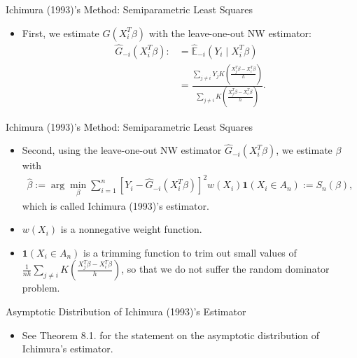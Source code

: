 \documentclass[xcolor=svgnames,dvipdfmx,cjk]{beamer}
\theoremstyle{example}
\begin{document}
\begin{frame}{Ichimura (1993)'s Method: Semiparametric Least Squares}
  \begin{itemize}
  \item First, we estimate $G(X_i^{T}\beta)$  
        with the leave-one-out NW estimator:
        \begin{align*}
          \hat{G}_{-i}(X_i^{T}\beta) 
              :&= \hat{\mathbb{E}}_{-i}(Y_i \mid X_i^{T} \beta) \\
               &= \frac
                  {\sum_{j \neq i} Y_j 
                   K \left( \frac
                            {X_j^{T}\beta - X_i^{T}\beta}
                            {h} 
                     \right) 
                  }
                  {\sum_{j \neq i} 
                   K \left( \frac
                           {X_j^{T}\beta - X_i^{T}\beta}
                           {h} 
                     \right) 
                  }.
        \end{align*}
\end{itemize}
\end{frame}

\begin{frame}{Ichimura (1993)'s Method: Semiparametric Least Squares}
  \begin{itemize}
    \item Second, 
          using the leave-one-out NW estimator $\hat{G}_{-i}(X_i^{T}\beta)$,
          we estimate $\beta$ with
          \begin{align*}
            \hat{\beta} 
              := \arg \min_{\beta} 
                    \sum_{i=1}^{n}  
                          \left[ Y_i - \hat{G}_{-i}(X_i^{T}\beta) \right]^2 
                          w(X_i) \mathbf{1}(X_i \in A_n) := S_n(\beta),
          \end{align*}
          which is called \alert{Ichimura (1993)'s estimator}.
    \item  $w(X_i)$ is a nonnegative weight function.
    \item  $\mathbf{1}(X_i \in A_n)$ is a trimming function to trim out small values of 
           $\frac{1}{nh} \sum_{j \neq i} 
              K \left( \frac
                       {X_j^{T}\beta - X_i^{T}\beta}
                       {h} 
                \right) $,
           so that we do not suffer the random dominator problem. 
  \end{itemize}
\end{frame}


\begin{frame}{Asymptotic Distribution of Ichimura (1993)'s Estimator}
\begin{itemize}
  \item See Theorem 8.1. for the statement on the asymptotic distribution of Ichimura's estimator.
\end{itemize}
\end{frame}
\end{document}
